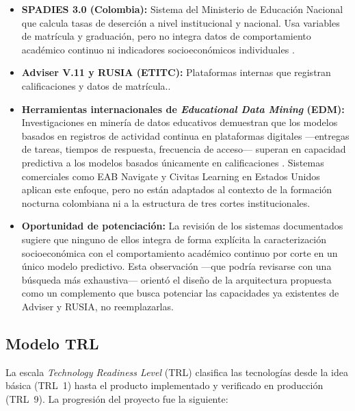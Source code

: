 \documentclass[12pt,letterpaper]{article}
\newcommand{\TRL}{\textit{Technology Readiness Level} (TRL)\xspace}
\newcommand{\EDM}{\textit{Educational Data Mining} (EDM)\xspace}
\begin{document}
\begin{itemize}
  \item \textbf{SPADIES 3.0 (Colombia):} Sistema del Ministerio de Educación Nacional que calcula tasas de deserción a nivel institucional y nacional. Usa variables de matrícula y graduación, pero no integra datos de comportamiento académico continuo ni indicadores socioeconómicos individuales \parencite{men2025}.
  \item \textbf{Adviser V.11 y RUSIA (ETITC):} Plataformas internas que registran calificaciones y datos de matrícula.\parencite{bersoft2024}.
  \item \textbf{Herramientas internacionales de \EDM:} Investigaciones en minería de datos educativos demuestran que los modelos basados en registros de actividad continua en plataformas digitales —entregas de tareas, tiempos de respuesta, frecuencia de acceso— superan en capacidad predictiva a los modelos basados únicamente en calificaciones \parencite{macfadyen2010}. Sistemas comerciales como EAB Navigate y Civitas Learning en Estados Unidos aplican este enfoque, pero no están adaptados al contexto de la formación nocturna colombiana ni a la estructura de tres cortes institucionales.
  \item \textbf{Oportunidad de potenciación:} La revisión de los sistemas documentados sugiere que ninguno de ellos integra de forma explícita la caracterización socioeconómica con el comportamiento académico continuo por corte en un único modelo predictivo. Esta observación —que podría revisarse con una búsqueda más exhaustiva— orientó el diseño de la arquitectura propuesta como un complemento que busca potenciar las capacidades ya existentes de Adviser y RUSIA, no reemplazarlas.
\end{itemize}

\subsection{Modelo TRL}

La escala \TRL clasifica las tecnologías desde la idea básica (TRL~1) hasta el producto implementado y verificado en producción (TRL~9). La progresión del proyecto fue la siguiente:
\end{document}
